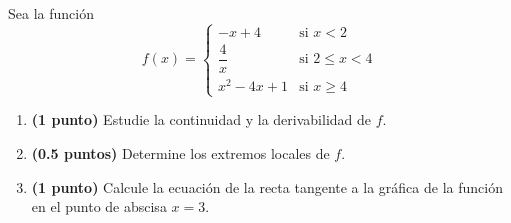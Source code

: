 
Sea la función
\[
f(x)=\begin{cases}-x+4&\text{si }x<2\\[0.2em]\dfrac4x&\text{si }2\leq x<4\\[0.6em]x^2-4x+1&\text{si }x\geq4\end{cases}
\]
\begin{enumerate}[label=\alph*)]
\item \textbf{(1 punto)} Estudie la continuidad y la derivabilidad de $f$.
\item \textbf{(0.5 puntos)} Determine los extremos locales de $f$.
\item \textbf{(1 punto)} Calcule la ecuación de la recta tangente a la gráfica de la función en el punto de abscisa $x=3$.
\end{enumerate}
